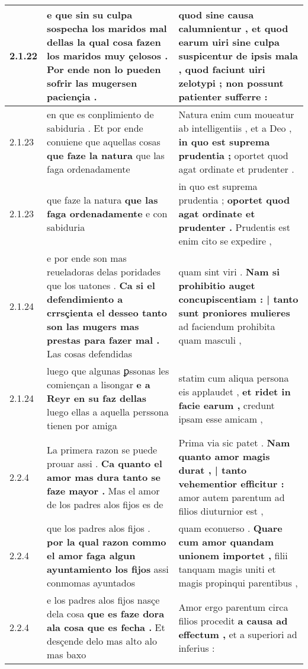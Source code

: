 \begin{tabular}{|p{1cm}|p{6.5cm}|p{6.5cm}|}
2.1.22 & e que sin su culpa sospecha los maridos mal dellas \textbf{ la qual cosa fazen los maridos muy çelosos . } Por ende non lo pueden sofrir las mugersen paciençia . & quod sine causa calumnientur , et quod earum uiri sine culpa suspicentur de ipsis mala , \textbf{ quod faciunt uiri zelotypi ; } non possunt patienter sufferre : \\\hline
2.1.23 & en que es conplimiento de sabiduria . Et por ende conuiene que aquellas cosas \textbf{ que faze la natura } que las faga ordenadamente & Natura enim cum moueatur ab intelligentiis , et a Deo , \textbf{ in quo est suprema prudentia ; } oportet quod agat ordinate et prudenter . \\\hline
2.1.23 & que faze la natura \textbf{ que las faga ordenadamente } e con sabiduria & in quo est suprema prudentia ; \textbf{ oportet quod agat ordinate et prudenter . } Prudentis est enim cito se expedire , \\\hline
2.1.24 & e por ende son mas reueladoras delas poridades que los uatones . \textbf{ Ca si el defendimiento a crrsçienta el desseo tanto son las mugers mas prestas para fazer mal . } Las cosas defendidas & quam sint viri . \textbf{ Nam si prohibitio auget concupiscentiam : | tanto sunt proniores mulieres } ad faciendum prohibita quam masculi , \\\hline
2.1.24 & luego que algunas ꝑssonas les comiençan a lisongar \textbf{ e a Reyr en su faz dellas } luego ellas a aquella perssona tienen por amiga & statim cum aliqua persona eis applaudet , \textbf{ et ridet in facie earum , } credunt ipsam esse amicam , \\\hline
2.2.4 & La primera razon se puede prouar assi . \textbf{ Ca quanto el amor mas dura tanto se faze mayor . } Mas el amor de los padres alos fijos es de & Prima via sic patet . \textbf{ Nam quanto amor magis durat , | tanto vehementior efficitur : } amor autem parentum ad filios diuturnior est , \\\hline
2.2.4 & que los padres alos fijos . \textbf{ por la qual razon commo el amor faga algun ayuntamiento los fijos } assi conmomas ayuntados & quam econuerso . \textbf{ Quare cum amor quandam unionem importet , } filii tanquam magis uniti et magis propinqui parentibus , \\\hline
2.2.4 & e los padres alos fijos nasçe dela cosa \textbf{ que es faze dora ala cosa que es fecha . } Et desçende delo mas alto alo mas baxo & Amor ergo parentum circa filios procedit \textbf{ a causa ad effectum , } et a superiori ad inferius : \\\hline

\end{tabular}
